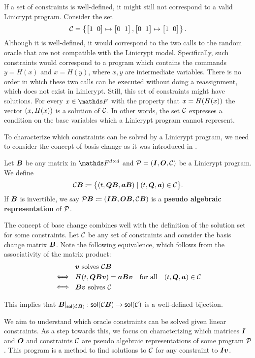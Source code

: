 If a set of constraints is well-defined, it might still not correspond to a valid Linicrypt program.
Consider the set
\[
\C = \left\{ \m{1&0} \mapsto \m{0&1}, \m{0&1} \mapsto \m{1&0}\right\}.
\]
Although it is well-defined,
it would correspond to the two calls to the random oracle that are not compatible with the Linicrypt model.
Specifically, such constraints would correspond to a program which contains the commands
$y = H(x)$ and $x = H(y)$, where $x,y$ are intermediate variables.
There is no order in which these two calls can be executed without doing a reassignment,
which does not exist in Linicrypt.
Still, this set of constraints might have solutions.
For every $x \in \F$ with the property that $x = \H(\H(x))$ the vector $(x, \H(x))$ is a solution of $\C$.
In other words,
the set $\C$ expresses a condition on the base variables which a Linicrypt program cannot represent.

To characterize which constraints can be solved by a Linicrypt program,
we need to consider the concept of basis change as it was introduced in \cite{C:CarRos16}.

\begin{defn}
    Let $\v B$ be any matrix in $\F^{\base \times \base}$
    and $\P = (\Inp, \O, \C)$ be a Linicrypt program.
    We define 
    \[
        \C \B \coloneqq \big\{ (t, \Q \B, \va \B) \mid (t, \Q, \va) \in \C \big\}.
    \]
    If $\B$ is invertible,
    we say $\P\B \coloneqq (\Inp \B, \O \B, \C \B)$ is a \textbf{pseudo algebraic representation} of $\P$.
\end{defn}

The concept of base change combines well with the definition of the solution set for some constraints.
Let $\C$ be any set of constraints and consider the basis change matrix $\B$.
Note the following equivalence, which follows from the associativity of the matrix product:
\begin{align*}
&\parbox{30pt}{\phantom{$\iff$}} \vv \textrm{ solves } \C\B \\
&\parbox{30pt}{$\iff$} \H(t, \Q \B \vv) = \va \B \vv \quad \textrm{for all} \quad (t, \Q, \va) \in \C \\
&\parbox{30pt}{$\iff$} \B \vv \textrm{ solves } \C
\end{align*}

This implies that $\B|_{\sol(\C\B)}: \sol(\C\B) \to \sol(\C)$ is a well-defined bijection.

We aim to understand which oracle constraints can be solved given linear constraints.
As a step towards this, we focus on characterizing which matrices $\I$ and $\O$ and constraints $\C$ are pseudo algebraic representations of some program $\P$. 
This program is a method to find solutions to $\C$ for any constraint to $\I\vv$.

